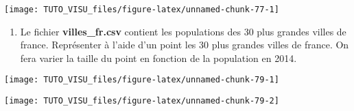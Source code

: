 \documentclass[]{article}
\newenvironment{Shaded}{\begin{snugshade}}{\end{snugshade}}
\newcommand{\DataTypeTok}[1]{\textcolor[rgb]{0.13,0.29,0.53}{#1}}
\newcommand{\DecValTok}[1]{\textcolor[rgb]{0.00,0.00,0.81}{#1}}
\newcommand{\KeywordTok}[1]{\textcolor[rgb]{0.13,0.29,0.53}{\textbf{#1}}}
\newcommand{\NormalTok}[1]{#1}
\newcommand{\OperatorTok}[1]{\textcolor[rgb]{0.81,0.36,0.00}{\textbf{#1}}}
\newcommand{\StringTok}[1]{\textcolor[rgb]{0.31,0.60,0.02}{#1}}
\providecommand{\tightlist}{%
  \setlength{\itemsep}{0pt}\setlength{\parskip}{0pt}}
\theoremstyle{definition}
\theoremstyle{definition}
\theoremstyle{definition}
\theoremstyle{remark}
\begin{document}
\begin{center}\texttt{[image: TUTO\_VISU\_files/figure-latex/unnamed-chunk-77-1]} \end{center}

\begin{enumerate}
\def\labelenumi{\arabic{enumi}.}
\setcounter{enumi}{1}
\tightlist
\item
  Le fichier \textbf{villes\_fr.csv} contient les populations des 30 plus grandes villes de france. Représenter à l'aide d'un point les 30 plus grandes villes de france. On fera varier la taille du point en fonction de la population en 2014.
\end{enumerate}

\begin{center}\texttt{[image: TUTO\_VISU\_files/figure-latex/unnamed-chunk-79-1]} \end{center}

\begin{center}\texttt{[image: TUTO\_VISU\_files/figure-latex/unnamed-chunk-79-2]} \end{center}

\begin{Shaded}
\end{Shaded}
\end{document}
